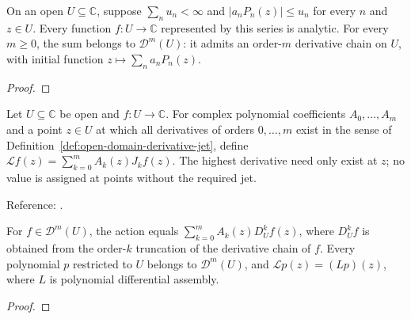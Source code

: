 \begin{supporting}
\begin{theorem}
\label{thm:normal-series-classical-domain}
\leanok
On an open $U\subseteq\mathbb C$, suppose $\sum_nu_n<\infty$ and
$|a_nP_n(z)|\le u_n$ for every $n$ and $z\in U$. Every function $f:U\to\mathbb C$
represented by this series is analytic. For every $m\ge0$, the sum belongs to $\mathcal D^m(U)$: it admits an order-$m$ derivative chain on $U$, with initial function $z\mapsto\sum_n a_nP_n(z)$.
\end{theorem}
\begin{proof}
\leanok
\end{proof}

\begin{definition}
\label{def:function-differential-operator}
\leanok
Let $U\subseteq\mathbb C$ be open and $f:U\to\mathbb C$. For complex polynomial
coefficients $A_0,\ldots,A_m$ and a point $z\in U$ at which all derivatives of orders $0,\ldots,m$ exist in the sense of Definition~\ref{def:open-domain-derivative-jet}, define
$\mathcal Lf(z)=\sum_{k=0}^m A_k(z)J_kf(z)$. The highest derivative need
only exist at $z$; no value is assigned at points without the required jet.

Reference: \cite[Section 3]{olver-townsend}.
\end{definition}

\begin{theorem}
\label{thm:function-differential-operator}
\leanok
For $f\in\mathcal D^m(U)$, the action equals
$\sum_{k=0}^m A_k(z)D_U^kf(z)$, where $D_U^kf$ is obtained from the order-$k$ truncation of the derivative chain of $f$. Every polynomial $p$ restricted to $U$ belongs to $\mathcal D^m(U)$, and
$\mathcal Lp(z)=(Lp)(z)$, where $L$ is polynomial differential assembly.
\end{theorem}
\begin{proof}
\leanok
\end{proof}
\end{supporting}



